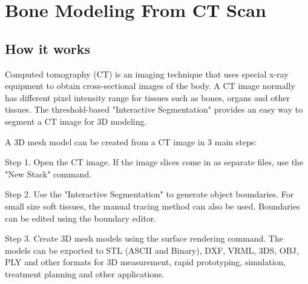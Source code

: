 \documentclass{article}
\begin{document}
\section{Bone Modeling From CT  Scan}
\subsection{How it works }
Computed tomography (CT) is an imaging technique that uses special x-ray equipment to obtain cross-sectional images of the body. A CT image normally has different pixel intensity range for tissues such as bones, organs and other tissues. The threshold-based "Interactive Segmentation" provides an easy way to segment a CT image for 3D modeling.

A 3D mesh model can be created from a CT image in 3 main steps:

Step 1. Open the CT image. If the image slices come in as separate files, use the "New Stack" command. 

Step 2. Use the "Interactive Segmentation" to generate object boundaries. For small size soft tissues, the manual tracing method can also be used. Boundaries can be edited using the boundary editor.

Step 3. Create 3D mesh models using the surface rendering command. The models can be exported to STL (ASCII and Binary), DXF, VRML, 3DS, OBJ, PLY  and other formats for 3D measurement, rapid prototyping, simulation, treatment planning and other applications.
\end{document}
